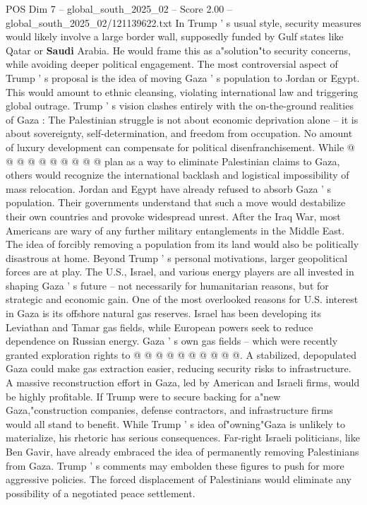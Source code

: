 \begin{textsample}{POS Dim 7 – global\_south\_2025\_02 – Score 2.00 – global\_south\_2025\_02/121139622.txt}
In Trump ' s usual style, security measures would likely involve a large border wall, supposedly funded by Gulf states like Qatar or \textbf{Saudi} Arabia.
He would frame this as a"solution"to security concerns, while avoiding deeper political engagement.
The most controversial aspect of Trump ' s proposal is the idea of moving Gaza ' s population to Jordan or Egypt.
This would amount to ethnic cleansing, violating international law and triggering global outrage.
Trump ' s vision clashes entirely with the on-the-ground realities of Gaza : The Palestinian struggle is not about economic deprivation alone -- it is about sovereignty, self-determination, and freedom from occupation.
No amount of luxury development can compensate for political disenfranchisement.
While @ @ @ @ @ @ @ @ @ @ plan as a way to eliminate Palestinian claims to Gaza, others would recognize the international backlash and logistical impossibility of mass relocation.
Jordan and Egypt have already refused to absorb Gaza ' s population.
Their governments understand that such a move would destabilize their own countries and provoke widespread unrest.
After the Iraq War, most Americans are wary of any further military entanglements in the Middle East.
The idea of forcibly removing a population from its land would also be politically disastrous at home.
Beyond Trump ' s personal motivations, larger geopolitical forces are at play.
The U.S., Israel, and various energy players are all invested in shaping Gaza ' s future -- not necessarily for humanitarian reasons, but for strategic and economic gain.
One of the most overlooked reasons for U.S. interest in Gaza is its offshore natural gas reserves.
Israel has been developing its Leviathan and Tamar gas fields, while European powers seek to reduce dependence on Russian energy.
Gaza ' s own gas fields -- which were recently granted exploration rights to @ @ @ @ @ @ @ @ @ @.
A stabilized, depopulated Gaza could make gas extraction easier, reducing security risks to infrastructure.
A massive reconstruction effort in Gaza, led by American and Israeli firms, would be highly profitable.
If Trump were to secure backing for a"new Gaza,"construction companies, defense contractors, and infrastructure firms would all stand to benefit.
While Trump ' s idea of"owning"Gaza is unlikely to materialize, his rhetoric has serious consequences.
Far-right Israeli politicians, like Ben Gavir, have already embraced the idea of permanently removing Palestinians from Gaza.
Trump ' s comments may embolden these figures to push for more aggressive policies.
The forced displacement of Palestinians would eliminate any possibility of a negotiated peace settlement.

\end{textsample}
